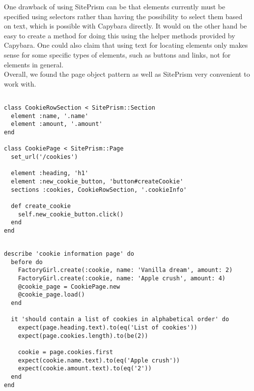 One drawback of using SitePrism can be that elements currently must be
specified using selectors rather than having the possibility to select
them based on text, which is possible with Capybara directly. It would
on the other hand be easy to create a method for doing this using the
helper methods provided by Capybara. One could also claim that using
text for locating elements only makes sense for some specific types of
elements, such as buttons and links, not for elements in general.\\

Overall, we found the page object pattern as well as SitePrism very
convenient to work with.\\

\begin{lstlisting}[caption=Page definition for a page with a list of cookie information.,
                   label=lst:siteprism_page, float=t]

class CookieRowSection < SitePrism::Section
  element :name, '.name'
  element :amount, '.amount'
end

class CookiePage < SitePrism::Page
  set_url('/cookies')

  element :heading, 'h1'
  element :new_cookie_button, 'button#createCookie'
  sections :cookies, CookieRowSection, '.cookieInfo'

  def create_cookie
    self.new_cookie_button.click()
  end
end

\end{lstlisting}

\begin{lstlisting}[caption=Browser test using SitePrism a page object defined in
                           code listing \ref{lst:siteprism_page}.,
                   label=lst:siteprism_test, float=t]

describe 'cookie information page' do
  before do
    FactoryGirl.create(:cookie, name: 'Vanilla dream', amount: 2)
    FactoryGirl.create(:cookie, name: 'Apple crush', amount: 4)
    @cookie_page = CookiePage.new
    @cookie_page.load()
  end

  it 'should contain a list of cookies in alphabetical order' do
    expect(page.heading.text).to(eq('List of cookies'))
    expect(page.cookies.length).to(be(2))

    cookie = page.cookies.first
    expect(cookie.name.text).to(eq('Apple crush'))
    expect(cookie.amount.text).to(eq('2'))
  end
end

\end{lstlisting}
